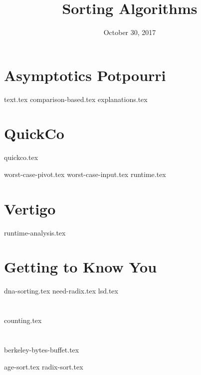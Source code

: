 \documentclass[11pt]{exam}
\title{Sorting Algorithms}
\date{October 30, 2017}
\begin{document}
\maketitle

\section{Asymptotics Potpourri}
{text.tex}
{comparison-based.tex}
{explanations.tex}


\section{QuickCo}
{quickco.tex}
\begin{questions}
{worst-case-pivot.tex}
{worst-case-input.tex}
{runtime.tex}
\end{questions}

\section{Vertigo}
\begin{questions}
{runtime-analysis.tex}
\end{questions}

\clearpage

\section{Getting to Know You}
\begin{questions}
{dna-sorting.tex}
{need-radix.tex}
{lsd.tex}
\end{questions}

\section{}
{counting.tex}

\section{}
{berkeley-bytes-buffet.tex}
\begin{questions}
{age-sort.tex}
{radix-sort.tex}
\end{questions}
\end{document}
